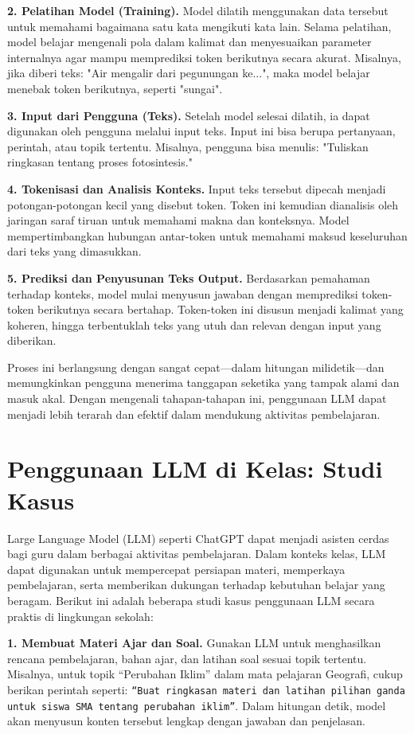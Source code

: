 \textbf{2. Pelatihan Model (Training).}  
Model dilatih menggunakan data tersebut untuk memahami bagaimana satu kata mengikuti kata lain. Selama pelatihan, model belajar mengenali pola dalam kalimat dan menyesuaikan parameter internalnya agar mampu memprediksi token berikutnya secara akurat. Misalnya, jika diberi teks: "Air mengalir dari pegunungan ke...", maka model belajar menebak token berikutnya, seperti "sungai".

\textbf{3. Input dari Pengguna (Teks).}  
Setelah model selesai dilatih, ia dapat digunakan oleh pengguna melalui input teks. Input ini bisa berupa pertanyaan, perintah, atau topik tertentu. Misalnya, pengguna bisa menulis: "Tuliskan ringkasan tentang proses fotosintesis."

\textbf{4. Tokenisasi dan Analisis Konteks.}  
Input teks tersebut dipecah menjadi potongan-potongan kecil yang disebut token. Token ini kemudian dianalisis oleh jaringan saraf tiruan untuk memahami makna dan konteksnya. Model mempertimbangkan hubungan antar-token untuk memahami maksud keseluruhan dari teks yang dimasukkan.

\textbf{5. Prediksi dan Penyusunan Teks Output.}  
Berdasarkan pemahaman terhadap konteks, model mulai menyusun jawaban dengan memprediksi token-token berikutnya secara bertahap. Token-token ini disusun menjadi kalimat yang koheren, hingga terbentuklah teks yang utuh dan relevan dengan input yang diberikan.

Proses ini berlangsung dengan sangat cepat—dalam hitungan milidetik—dan memungkinkan pengguna menerima tanggapan seketika yang tampak alami dan masuk akal. Dengan mengenali tahapan-tahapan ini, penggunaan LLM dapat menjadi lebih terarah dan efektif dalam mendukung aktivitas pembelajaran.



\section{Penggunaan LLM di Kelas: Studi Kasus}

Large Language Model (LLM) seperti ChatGPT dapat menjadi asisten cerdas bagi guru dalam berbagai aktivitas pembelajaran. Dalam konteks kelas, LLM dapat digunakan untuk mempercepat persiapan materi, memperkaya pembelajaran, serta memberikan dukungan terhadap kebutuhan belajar yang beragam. Berikut ini adalah beberapa studi kasus penggunaan LLM secara praktis di lingkungan sekolah:

\textbf{1. Membuat Materi Ajar dan Soal.}  
Gunakan LLM untuk menghasilkan rencana pembelajaran, bahan ajar, dan latihan soal sesuai topik tertentu. Misalnya, untuk topik “Perubahan Iklim” dalam mata pelajaran Geografi, cukup berikan perintah seperti: \texttt{“Buat ringkasan materi dan latihan pilihan ganda untuk siswa SMA tentang perubahan iklim”}. Dalam hitungan detik, model akan menyusun konten tersebut lengkap dengan jawaban dan penjelasan.

